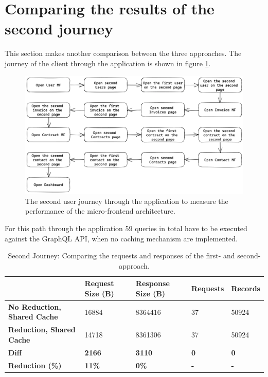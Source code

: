 \section{Comparing the results of the second journey}

This section makes another comparison between the three approaches. The journey of the client through the application is shown in figure \ref{fig:results:evaluation-second-path}.


\ifshowImages
\begin{figure}[H]
\centering
\includegraphics[width=1\linewidth]{images/results/evaluation-second-path.png}
\caption{The second user journey through the application to measure the performance of the micro-frontend architecture.}\label{fig:results:evaluation-second-path}
\end{figure}
\fi

\noindent For this path through the application 59 queries in total have to be executed against the
GraphQL \ac{API}, when no caching mechanism are implemented.

\ifshowTables
\begin{table}[H]
\begin{tabular}{|l|l|l|l|l|}
  \hline
  & \textbf{Request Size (B)} & \textbf{Response Size (B)} & \textbf{Requests} & \textbf{Records} \\
  \hline
  \textbf{No Reduction, Shared Cache} & 16884 & 8364416 & 37 & 50924 \\
  \hline
  \textbf{Reduction, Shared Cache} & 14718 & 8361306 & 37 & 50924 \\
  \hline
  \hline
  \textbf{Diff} & \textbf{2166} & \textbf{3110} & \textbf{0} & \textbf{0} \\
  \hline
  \textbf{Reduction (\%)} & \textbf{11\%} & \textbf{0\%} & \textbf{-} & \textbf{-} \\
  \hline
  \end{tabular}
  \caption{Second Journey: Comparing the requests and responses of the first- and second-approach.}\label{table:results:size-comparison-second-path-no-cache-no-reduction-cache-no-reduction}
\end{table}
\fi

